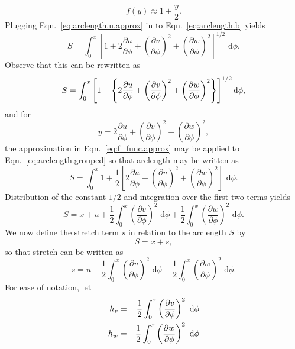 \begin{equation}
f(y) \approx 1+\frac{y}{2}.
\label{eq:f_func.approx}
\end{equation}
Plugging Eqn.~\ref{eq:arclength.u.approx} in to Eqn.~\ref{eq:arclength.b} yields
\begin{equation}
S = \int_0^x \left[1+2\frac{\partial u}{\partial\phi}+\left(\frac{\partial v}{\partial\phi}\right)^2+\left(\frac{\partial w}{\partial\phi}\right)^2\right]^{1/2} \text{ d}\phi.
\end{equation}
Observe that this can be rewritten as 
\begin{equation}
S = \int_0^x \left[1+\left\lbrace 2\frac{\partial u}{\partial\phi}+\left(\frac{\partial v}{\partial\phi}\right)^2+\left(\frac{\partial w}{\partial\phi}\right)^2\right\rbrace\right]^{1/2} \text d\phi,
\label{eq:arclength.grouped}
\end{equation}
and for 
\begin{equation}
y = 2\frac{\partial u}{\partial\phi}+\left(\frac{\partial v}{\partial\phi}\right)^2+\left(\frac{\partial w}{\partial\phi}\right)^2,
\end{equation}
the approximation in Eqn.~\ref{eq:f_func.approx} may be applied to Eqn.~\ref{eq:arclength.grouped} so that arclength may be written as
\begin{equation}
S = \int_0^x 1+\frac{1}{2}\left[ 2\frac{\partial u}{\partial\phi}+\left(\frac{\partial v}{\partial\phi}\right)^2+\left(\frac{\partial w}{\partial\phi}\right)^2 \right]\text{ d}\phi.
\end{equation}
Distribution of the constant $1/2$ and integration over the first two terms yields
\begin{equation}
S = x + u + \frac{1}{2}\int_0^x\left(\frac{\partial v}{\partial\phi}\right)^2\text{ d}\phi+\frac{1}{2}\int_0^x\left(\frac{\partial w}{\partial\phi}\right)^2\text{ d}\phi.
\end{equation}
We now define the stretch term $s$ in relation to the arclength $S$ by
\begin{equation}
S = x+s,
\end{equation}
so that stretch can be written as
\begin{equation}
s = u + \frac{1}{2}\int_0^x\left(\frac{\partial v}{\partial\phi}\right)^2\text{ d}\phi+\frac{1}{2}\int_0^x\left(\frac{\partial w}{\partial\phi}\right)^2\text{ d}\phi.
\end{equation}
For ease of notation, let
\begin{eqnarray}
h_v &=& \frac{1}{2}\int_0^x\left(\frac{\partial v}{\partial\phi}\right)^2\text{ d}\phi{\vrule width 0in depth .1in}\\
h_w &=& \frac{1}{2}\int_0^x\left(\frac{\partial w}{\partial\phi}\right)^2\text{ d}\phi
\end{eqnarray}
